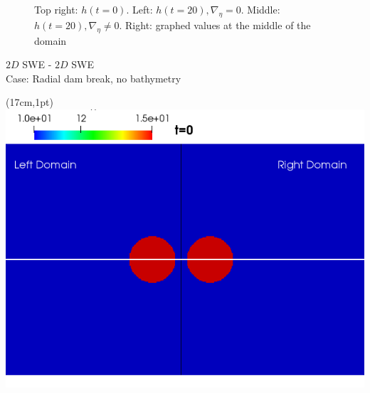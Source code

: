\begin{frame}
\begin{figure}[htp]
\caption{Top right: $h(t=0)$. Left: $h(t=20), \nabla_\eta=0$. Middle: $h(t=20),\nabla_\eta \neq0$. Right: graphed values at the middle of the domain}
\end{figure}

\end{frame}


\begin{frame}
\vspace{-0.5cm}
{\large $2D$ SWE - $2D$ SWE \textbf{}}\\
Case: Radial dam break, no bathymetry
\begin{textblock*}{1cm}(17cm,1pt) %
\includegraphics[scale=0.22]{./Resources/Images/bidirectional0_g_0.png}
\end{textblock*}


\end{frame}
